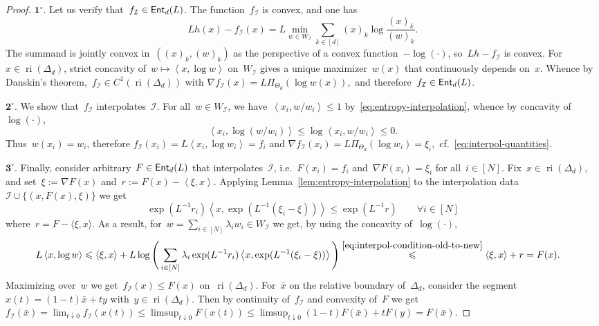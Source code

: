 \documentclass[11pt]{article}
\numberwithin{equation}{section}
\let\le\leqslant
\theoremstyle{remark}
\newcommand{\proofstep}[1]{$\textbf{#1}^{\circ}$}
\newcommand{\ip}[2]{\left\langle #1,#2\right\rangle}
\newcommand{\ri}{\operatorname{ri}}
\newcommand{\Ent}{\textup{\textsf{Ent}}}
\newcommand{\Fh}{\Ent_d}
\newcommand{\Simp}{\Delta_d}
\newcommand{\cI}{\mathcal{I}}
\newcommand{\ProjTan}{\Pi_{\Tan}}
\newcommand{\Tan}{\Theta_d}
\newcommand{\1}{\mathbf{1}}
\newcommand{\bnabla}{\nabla}
\begin{document}
\begin{proof}
\proofstep{1}. Let us verify that~$f_{\cI} \in \Fh(L)$. 
The function~$f_{\cI}$ is convex, and one has
\[
Lh(x)-f_{\cI}(x)=L\min_{w\in W_{\cI}} \sum_{k \in [d]} (x)_k \log\frac{(x)_k}{(w)_k}.
\]
The summand is jointly convex in~$((x)_k,(w)_k)$ as the perspective of a convex function~$-\log(\cdot)$, so~$Lh-f_{\cI}$ is convex. 
For~$x\in\ri(\Simp)$, strict concavity of~$w\mapsto\ip{x}{\log w}$ on~$W_{\cI}$ gives a unique maximizer~$w(x)$ that continuously depends on~$x$. Whence by  Danskin's theorem,~$f_{\cI} \in C^1(\ri(\Simp))$ with
$
\bnabla f_{\cI}(x)=L\ProjTan (\log w(x)),
$
and therefore~$f_{\cI}\in\Fh(L)$.

\proofstep{2}. 
We show that~$f_{\cI}$ interpolates~$\cI$. 
For all~$w \in W_{\cI}$, we have~$\ip{x_i}{w/w_i} \le 1$  by~\eqref{eq:entropy-interpolation}, whence by concavity of~$\log(\cdot)$,
\[
 \ip{x_i}{\log(w/w_i)}\le\log\ip{x_i}{w/w_i} \le 0.
\]
Thus~$w(x_i) = w_i$, therefore
$f_{\cI}(x_i)=L\ip{x_i}{\log w_i}=f_i$
and
$
\bnabla f_{\cI}(x_i)=L\ProjTan(\log w_i)=\xi_i,
$
cf.~\eqref{eq:interpol-quantities}.

\proofstep{3}.
Finally, consider arbitrary~$F\in\Fh(L)$ that interpolates~$\cI$, i.e.~$F(x_i)=f_i$ and~$\bnabla F(x_i)=\xi_i$ for all~$i\in[N]$. 
Fix~$x\in\ri(\Simp)$, and set~$\xi:=\bnabla F(x)$ and~$r:=F(x)-\ip{\xi}{x}$. Applying Lemma~\ref{lem:entropy-interpolation} to the interpolation data~$\cI \cup \{(x,F(x),\xi)\}$ we get
\begin{equation}
\label{eq:interpol-condition-old-to-new}
 \exp({L^{-1}}{r_i})
 \ip{x}{\exp({L^{-1}}{(\xi_i-\xi)})}
 \le \exp({L^{-1}}{r})
 \qquad \forall i \in[N]
\end{equation}
where~$r = F-\langle\xi,x\rangle$.
As a result, for~$w=\sum_{i \in [N]} \lambda_i w_i\in W_{\cI}$ we get,  by using the concavity of~$\log(\cdot)$, 
\begin{align*}
L\ip{x}{\log w}
 &\le \ip{\xi}{x}
 +L\log\Bigg(\sum_{i \in [N]} \lambda_i \exp({L^{-1}}{r_i})
 \ip{x}{\exp({L^{-1}}{(\xi_i-\xi)})}\Bigg)
\stackrel{\eqref{eq:interpol-condition-old-to-new}}{\le} \ip{\xi}{x}+r 
 = F(x).
\end{align*}
Maximizing over~$w$ we get~$f_{\cI}(x)\le F(x)$ on~$\ri(\Simp)$. 
For~$\bar x$ on the relative boundary of~$\Simp$, consider the segment~$x(t) = (1-t)\bar x + t y$ with~$y \in \ri(\Simp)$. Then by continuity of~$f_{\cI}$ and convexity of~$F$ we get~$f_{\cI}(\bar x)=\lim_{t \downarrow 0}f_{\cI}(x(t))\le\limsup_{t\downarrow0}F(x(t))\le \limsup_{t \downarrow 0} (1-t) F(\bar x) + t F(y) = F(\bar x)$.
\end{proof}
\end{document}
